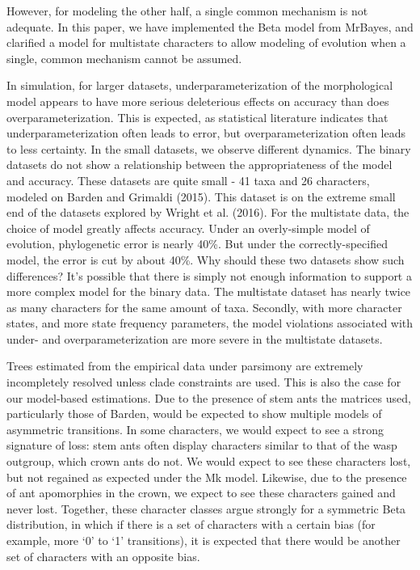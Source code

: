\documentclass[]{article}
\begin{document}
However, for modeling the other half, a single common mechanism is not adequate. 
In this paper, we have implemented the Beta model from MrBayes, and clarified a model for multistate characters to allow modeling of evolution when a single, common mechanism cannot be assumed. \par
In simulation, for larger datasets, underparameterization of the morphological model appears to have more serious deleterious effects on accuracy than does overparameterization.
This is expected, as statistical literature indicates that underparameterization often leads to error, but overparameterization often leads to less certainty.
In the small datasets, we observe different dynamics. 
The binary datasets do not show a relationship between the appropriateness of the model and accuracy.
These datasets are quite small - 41 taxa and 26 characters, modeled on Barden and Grimaldi (2015). 
This dataset is on the extreme small end of the datasets explored by Wright et al. (2016). 
For the multistate data, the choice of model greatly affects accuracy. 
Under an overly-simple model of evolution, phylogenetic error is nearly 40\%. 
But under the correctly-specified model, the error is cut by about 40\%. 
Why should these two datasets show such differences? 
It's possible that there is simply not enough information to support a more complex model for the binary data.
The multistate dataset has nearly twice as many characters for the same amount of taxa. 
Secondly, with more character states, and more state frequency parameters, the model violations associated with under- and overparameterization are more severe in the multistate datasets.
\par
Trees estimated from the empirical data under parsimony are extremely incompletely resolved unless clade constraints are used.
This is also the case for our model-based estimations. 
Due to the presence of stem ants the matrices used, particularly those of Barden, would be expected to show multiple models of asymmetric transitions. 
In some characters, we would expect to see a strong signature of loss: stem ants often display characters similar to that of the wasp outgroup, which crown ants do not.
We would expect to see these characters lost, but not regained as expected under the Mk model.
Likewise, due to the presence of ant apomorphies in the crown, we expect to see these characters gained and never lost.
Together, these character classes argue strongly for a symmetric Beta distribution, in which if there is a set of characters with a certain bias (for example, more `0' to `1' transitions), it is expected that there would be another set of characters with an opposite bias. \par
\end{document}
